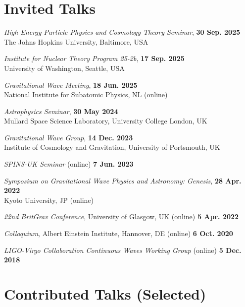 \newcommand{\playsymbol}{$\blacktriangleright$}

\section{Invited Talks}

\secstartswithlist{}%
\begin{etaremune}
    \item \textit{High Energy Particle Physics and Cosmology Theory Seminar},
    \hfill \textbf{30 Sep. 2025} \\
    The Johns Hopkins University, Baltimore, USA
    \item \textit{Institute for Nuclear Theory Program 25-2b},
    \hfill \textbf{17 Sep. 2025} \\
    University of Washington, Seattle, USA
    \item \textit{Gravitational Wave Meeting}, \hfill \textbf{18 Jun. 2025} \\
    National Institute for Subatomic Physics, NL (online)
    \item \textit{Astrophysics Seminar}, \hfill \textbf{30 May 2024} \\
    Mullard Space Science Laboratory, University College London, UK
    \item \textit{Gravitational Wave Group}, \hfill \textbf{14 Dec. 2023} \\
    Institute of Cosmology and Gravitation, University of Portsmouth, UK
    \item \textit{SPINS-UK Seminar} (online) \hfill \textbf{7 Jun. 2023}
    \item
    \textit{Symposium on Gravitational Wave Physics and Astronomy: Genesis},
    \hfill \textbf{28 Apr. 2022} \\
    Kyoto University, JP (online)
    \item \textit{22nd BritGrav Conference}, University of Glasgow, UK (online)
    \hfill \textbf{5 Apr. 2022}
    \item \textit{Colloquium}, Albert Einstein Institute, Hannover, DE (online)
    \hfill \textbf{6 Oct. 2020}
    \item \textit{LIGO-Virgo Collaboration Continuous Waves Working Group}
    (online) \hfill \textbf{5 Dec. 2018}
\end{etaremune}

\section{Contributed Talks (Selected)}

